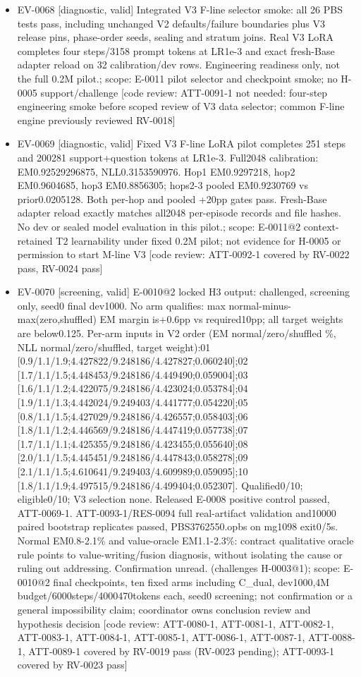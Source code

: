 \documentclass[11pt]{article}
\begin{document}
\begin{itemize}
\item EV-0068 [diagnostic, valid] Integrated V3 F-line selector smoke: all 26 PBS tests pass, including unchanged V2 defaults/failure boundaries plus V3 release pins, phase-order seeds, sealing and stratum joins. Real V3 LoRA completes four steps/3158 prompt tokens at LR1e-3 and exact fresh-Base adapter reload on 32 calibration/dev rows. Engineering readiness only, not the full 0.2M pilot.; scope: E-0011 pilot selector and checkpoint smoke; no H-0005 support/challenge [code review: ATT-0091-1 not needed: four-step engineering smoke before scoped review of V3 data selector; common F-line engine previously reviewed RV-0018]
\item EV-0069 [diagnostic, valid] Fixed V3 F-line LoRA pilot completes 251 steps and 200281 support+question tokens at LR1e-3. Full2048 calibration: EM0.92529296875, NLL0.3153590976. Hop1 EM0.9297218, hop2 EM0.9604685, hop3 EM0.8856305; hops2-3 pooled EM0.9230769 vs prior0.0205128. Both per-hop and pooled +20pp gates pass. Fresh-Base adapter reload exactly matches all2048 per-episode records and file hashes. No dev or sealed model evaluation in this pilot.; scope: E-0011@2 context-retained T2 learnability under fixed 0.2M pilot; not evidence for H-0005 or permission to start M-line V3 [code review: ATT-0092-1 covered by RV-0022 pass, RV-0024 pass]
\item EV-0070 [screening, valid] E-0010@2 locked H3 output: challenged, screening only, seed0 final dev1000. No arm qualifies: max normal-minus-max(zero,shuffled) EM margin is+0.6pp vs required10pp; all target weights are below0.125. Per-arm inputs in V2 order (EM normal/zero/shuffled \%, NLL normal/zero/shuffled, target weight):01 [0.9/1.1/1.9;4.427822/9.248186/4.427827;0.060240];02 [1.7/1.1/1.5;4.448453/9.248186/4.449490;0.059004];03 [1.6/1.1/1.2;4.422075/9.248186/4.423024;0.053784];04 [1.9/1.1/1.3;4.442024/9.249403/4.441777;0.054220];05 [0.8/1.1/1.5;4.427029/9.248186/4.426557;0.058403];06 [1.8/1.1/1.2;4.446569/9.248186/4.447419;0.057738];07 [1.7/1.1/1.1;4.425355/9.248186/4.423455;0.055640];08 [2.0/1.1/1.5;4.445451/9.248186/4.447843;0.058278];09 [2.1/1.1/1.5;4.610641/9.249403/4.609989;0.059095];10 [1.8/1.1/1.9;4.497515/9.248186/4.499404;0.052307]. Qualified0/10; eligible0/10; V3 selection none. Released E-0008 positive control passed, ATT-0069-1. ATT-0093-1/RES-0094 full real-artifact validation and10000 paired bootstrap replicates passed, PBS3762550.opbs on mg1098 exit0/5s. Normal EM0.8-2.1\% and value-oracle EM1.1-2.3\%: contract qualitative oracle rule points to value-writing/fusion diagnosis, without isolating the cause or ruling out addressing. Confirmation unread. (challenges H-0003@1); scope: E-0010@2 final checkpoints, ten fixed arms including C\_dual, dev1000,4M budget/6000steps/4000470tokens each, seed0 screening; not confirmation or a general impossibility claim; coordinator owns conclusion review and hypothesis decision [code review: ATT-0080-1, ATT-0081-1, ATT-0082-1, ATT-0083-1, ATT-0084-1, ATT-0085-1, ATT-0086-1, ATT-0087-1, ATT-0088-1, ATT-0089-1 covered by RV-0019 pass (RV-0023 pending); ATT-0093-1 covered by RV-0023 pass]

\end{itemize}
\end{document}
